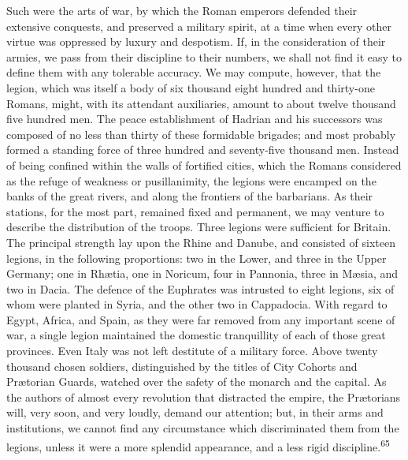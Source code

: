 Such were the arts of war, by which the Roman emperors defended
their extensive conquests, and preserved a military spirit, at a
time when every other virtue was oppressed by luxury and
despotism. If, in the consideration of their armies, we pass from
their discipline to their numbers, we shall not find it easy to
define them with any tolerable accuracy. We may compute, however,
that the legion, which was itself a body of six thousand eight
hundred and thirty-one Romans, might, with its attendant
auxiliaries, amount to about twelve thousand five hundred men.
The peace establishment of Hadrian and his successors was
composed of no less than thirty of these formidable brigades; and
most probably formed a standing force of three hundred and
seventy-five thousand men. Instead of being confined within the
walls of fortified cities, which the Romans considered as the
refuge of weakness or pusillanimity, the legions were encamped on
the banks of the great rivers, and along the frontiers of the
barbarians. As their stations, for the most part, remained fixed
and permanent, we may venture to describe the distribution of the
troops. Three legions were sufficient for Britain. The principal
strength lay upon the Rhine and Danube, and consisted of sixteen
legions, in the following proportions: two in the Lower, and
three in the Upper Germany; one in Rhætia, one in Noricum, four
in Pannonia, three in Mæsia, and two in Dacia. The defence of the
Euphrates was intrusted to eight legions, six of whom were
planted in Syria, and the other two in Cappadocia. With regard to
Egypt, Africa, and Spain, as they were far removed from any
important scene of war, a single legion maintained the domestic
tranquillity of each of those great provinces. Even Italy was not
left destitute of a military force. Above twenty thousand chosen
soldiers, distinguished by the titles of City Cohorts and
Prætorian Guards, watched over the safety of the monarch and the
capital. As the authors of almost every revolution that
distracted the empire, the Prætorians will, very soon, and very
loudly, demand our attention; but, in their arms and
institutions, we cannot find any circumstance which discriminated
them from the legions, unless it were a more splendid appearance,
and a less rigid discipline.\textsuperscript{65}



